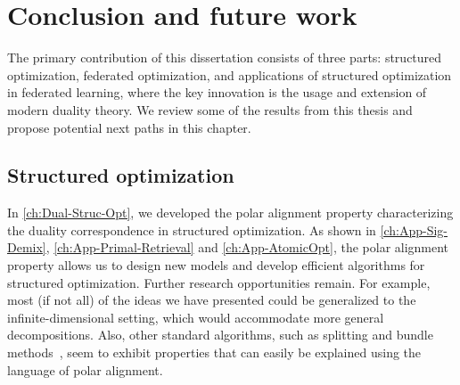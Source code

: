 
\chapter{Conclusion and future work}
\label{ch:conclusion}

The primary contribution of this dissertation consists of three parts: structured optimization, federated optimization, and applications of structured optimization in federated learning, where the key innovation is the usage and extension of modern duality theory. We review some of the results from this thesis and propose potential next paths in this chapter.


\section{Structured optimization}

In \autoref{ch:Dual-Struc-Opt}, we developed the polar alignment property characterizing the duality correspondence in structured optimization. As shown in \autoref{ch:App-Sig-Demix}, \autoref{ch:App-Primal-Retrieval} and \autoref{ch:App-AtomicOpt}, the polar alignment property allows us to design new models and develop efficient algorithms for structured optimization. Further research opportunities remain. For example, most (if not all) of the
ideas we have presented could be generalized to the infinite-dimensional
setting, which would accommodate more general decompositions. Also, other
standard algorithms, such as splitting and bundle methods~\cite{fan2019bundle}, seem to exhibit properties that can easily be explained using the language of polar alignment.

